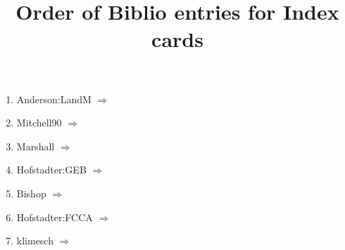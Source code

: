 \documentclass{memoir}
\begin{document}


\title{Order of Biblio entries for Index cards}
\maketitle

\newcommand{\mycite}[1]{#1 $\Rightarrow$ \citet{#1}}

\begin{enumerate}
\item \mycite{Anderson:LandM}
\item \mycite{Mitchell90} 
\item \mycite{Marshall}
\item \mycite{Hofstadter:GEB}
\item \mycite{Bishop}
\item \mycite{Hofstadter:FCCA}
\item \mycite{klimesch}
\end{enumerate}



\end{document}
